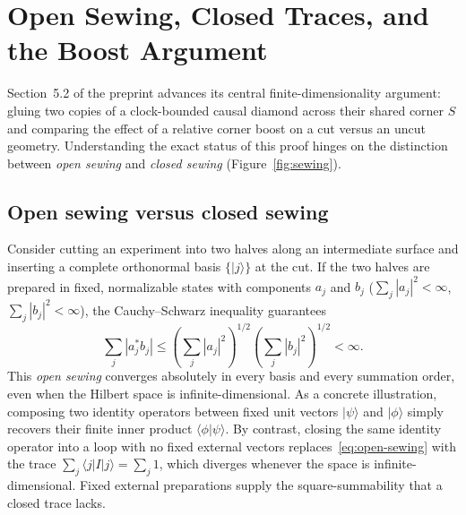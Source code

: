 \documentclass[10pt,a4paper]{article}
\begin{document}
\section[Open vs.\ Closed Sewing]{Open Sewing, Closed Traces, and the Boost Argument}
\label{sec:sewing}

Section~5.2 of the preprint advances its central finite-dimensionality argument: gluing two copies of a clock-bounded causal diamond across their shared corner $S$ and comparing the effect of a relative corner boost on a cut versus an uncut geometry. Understanding the exact status of this proof hinges on the distinction between \emph{open sewing} and \emph{closed sewing} (Figure~\ref{fig:sewing}).

\subsection{Open sewing versus closed sewing}
Consider cutting an experiment into two halves along an intermediate surface and inserting a complete orthonormal basis $\{|j\rangle\}$ at the cut. If the two halves are prepared in fixed, normalizable states with components $a_j$ and $b_j$ ($\sum_j |a_j|^2 < \infty$, $\sum_j |b_j|^2 < \infty$), the Cauchy--Schwarz inequality guarantees
\begin{equation}
  \sum_j |a_j^* b_j|
  \le \left(\sum_j |a_j|^2\right)^{1/2}
      \left(\sum_j |b_j|^2\right)^{1/2}
  < \infty.
  \label{eq:open-sewing}
\end{equation}
This \emph{open sewing} converges absolutely in every basis and every summation order, even when the Hilbert space is infinite-dimensional. As a concrete illustration, composing two identity operators between fixed unit vectors $|\psi\rangle$ and $|\phi\rangle$ simply recovers their finite inner product $\langle\phi|\psi\rangle$. By contrast, closing the same identity operator into a loop with no fixed external vectors replaces~\eqref{eq:open-sewing} with the trace $\sum_j \langle j|I|j\rangle = \sum_j 1$, which diverges whenever the space is infinite-dimensional. Fixed external preparations supply the square-summability that a closed trace lacks.
\end{document}
